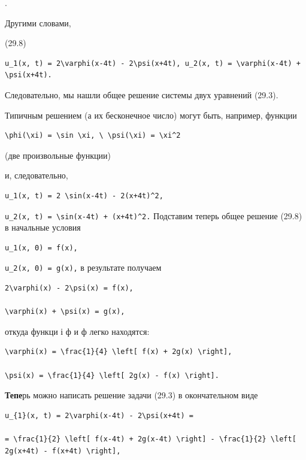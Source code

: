 \documentclass[
  ukrainian,
]{article}
\begin{document}
.

Другими словами,

(29.8)

\begin{verbatim}
u_1(x, t) = 2\varphi(x-4t) - 2\psi(x+4t), u_2(x, t) = \varphi(x-4t) + \psi(x+4t).
\end{verbatim}

Следовательно, мы нашли общее решение системы двух уравнений (29.3).

Типичным решением (а их бесконечное число) могут быть, например, функции

\begin{verbatim}
\phi(\xi) = \sin \xi, \ \psi(\xi) = \xi^2
\end{verbatim}

(две произвольные функции)

и, следовательно,

\begin{verbatim}
u_1(x, t) = 2 \sin(x-4t) - 2(x+4t)^2,
\end{verbatim}

\texttt{u\_2(x,\ t)\ =\ \textbackslash{}sin(x-4t)\ +\ (x+4t)\^{}2.}
Подставим теперь общее решение (29.8) в начальные условия

\begin{verbatim}
u_1(x, 0) = f(x),
\end{verbatim}

\texttt{u\_2(x,\ 0)\ =\ g(x),} в результате получаем

\begin{verbatim}
2\varphi(x) - 2\psi(x) = f(x),

\varphi(x) + \psi(x) = g(x),
\end{verbatim}

откуда функци і ф и ф легко находятся:

\begin{verbatim}
\varphi(x) = \frac{1}{4} \left[ f(x) + 2g(x) \right],

\psi(x) = \frac{1}{4} \left[ 2g(x) - f(x) \right].
\end{verbatim}

\textbf{Тепе}рь можно написать решение задачи (29.3) в окончательном
виде

\begin{verbatim}
u_{1}(x, t) = 2\varphi(x-4t) - 2\psi(x+4t) =

= \frac{1}{2} \left[ f(x-4t) + 2g(x-4t) \right] - \frac{1}{2} \left[ 2g(x+4t) - f(x+4t) \right],
\end{verbatim}
\end{document}
